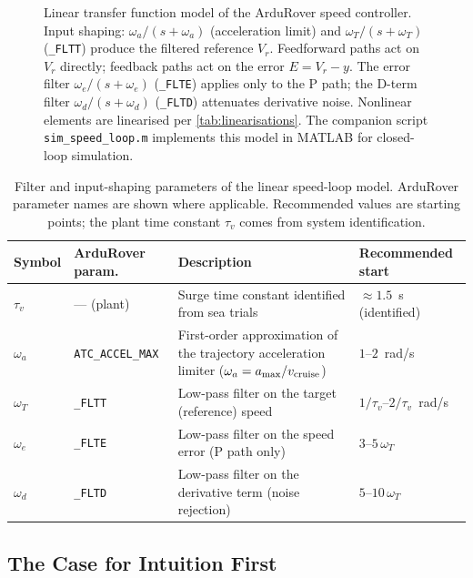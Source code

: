 \documentclass[../../book.tex]{subfiles}
\begin{document}
\begin{figure}[htbp]
{\begin{tikzpicture}[
  >=Latex, thick,
  block/.style = {draw, rectangle, minimum height=2.5em, minimum width=4.5em, align=center},
  sum/.style   = {draw, circle, inner sep=0pt, minimum size=1.2em},
]
\end{tikzpicture}%
}
\caption{Linear transfer function model of the ArduRover speed controller.
  Input shaping: $\omega_a/(s{+}\omega_a)$ (acceleration limit) and
  $\omega_T/(s{+}\omega_T)$ (\texttt{\_FLTT}) produce the filtered reference
  $V_r$.  Feedforward paths act on $V_r$ directly; feedback paths act on
  the error $E = V_r - y$.  The error filter $\omega_e/(s{+}\omega_e)$
  (\texttt{\_FLTE}) applies only to the P path; the D-term filter
  $\omega_d/(s{+}\omega_d)$ (\texttt{\_FLTD}) attenuates derivative noise.
  Nonlinear elements are linearised per \cref{tab:linearisations}.
  The companion script \texttt{sim\_speed\_loop.m} implements this model
  in MATLAB for closed-loop simulation.}
\label{fig:speed_loop_linear}
\end{figure}

\begin{table}[htbp]
\centering
\caption{Filter and input-shaping parameters of the linear speed-loop model.
  ArduRover parameter names are shown where applicable.
  Recommended values are starting points; the plant time constant $\tau_v$
  comes from system identification.}
\label{tab:filter_params}
\begin{tabular}{llp{4.8cm}l}
\toprule
Symbol & ArduRover param. & Description & Recommended start \\
\midrule
$\tau_v$ & --- (plant) &
  Surge time constant identified from sea trials &
  $\approx 1.5$~s (identified) \\
$\omega_a$ & \texttt{ATC\_ACCEL\_MAX} &
  First-order approximation of the trajectory acceleration limiter
  ($\omega_a = a_{\max}/v_{\rm cruise}$) &
  $1$--$2$~rad/s \\
$\omega_T$ & \texttt{\_FLTT} &
  Low-pass filter on the target (reference) speed &
  $1/\tau_v$--$2/\tau_v$~rad/s \\
$\omega_e$ & \texttt{\_FLTE} &
  Low-pass filter on the speed error (P path only) &
  $3$--$5\,\omega_T$ \\
$\omega_d$ & \texttt{\_FLTD} &
  Low-pass filter on the derivative term (noise rejection) &
  $5$--$10\,\omega_T$ \\
\bottomrule
\end{tabular}
\end{table}

\subsection{The Case for Intuition First}
\end{document}

